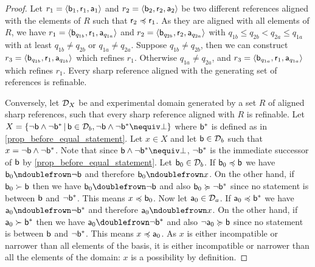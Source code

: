 \documentclass[11pt,letterpaper,fleqn]{memoir} %
\begin{document}
\begin{mathSection}
\begin{proof}
	Let $r_1 = \langle \stmt[b]_1, \stmt[r]_1, \stmt[a]_1\rangle$ and $r_2 = \langle \stmt[b]_2, \stmt[r]_2, \stmt[a]_2\rangle$ be two different references aligned with the elements of $R$ such that $\stmt[r]_2 \narrower \stmt[r]_1$. As they are aligned with all elements of $R$, we have $r_1 = \langle \stmt[b]_{q_{1b}}, \stmt[r]_1, \stmt[a]_{q_{1a}}\rangle$ and $r_2 = \langle \stmt[b]_{q_{2b}}, \stmt[r]_2, \stmt[a]_{q_{2a}}\rangle$ with $q_{1b} \leq q_{2b} < q_{2a} \leq q_{1a}$ with at least $q_{1b} \neq q_{2b}$ or $q_{1a} \neq q_{2a}$. Suppose $q_{1b} \neq q_{2b}$, then we can construct $r_3 = \langle \stmt[b]_{q_{1b}}, \stmt[r]_1, \stmt[a]_{q_{1b}}\rangle$ which refines $r_1$. Otherwise $q_{1a} \neq q_{2a}$, and  $r_3 = \langle \stmt[b]_{q_{1a}}, \stmt[r]_1, \stmt[a]_{q_{1a}}\rangle$ which refines $r_1$. Every sharp reference aligned with the generating set of references  is refinable.
	
	Conversely, let $\edomain_X$ be and experimental domain generated by a set $R$ of aligned sharp references, such that every sharp reference aligned with $R$ is refinable. Let $X = \{\NOT \stmt[b] \AND \NOT \stmt[b]^* \, | \,  \stmt[b] \in \edomain_b, \NOT \stmt[b] \AND \NOT \stmt[b]^* \nequiv \contradiction \}$ where $\stmt[b]^*$ is defined as in \ref{prop_before_equal_statement}. Let $x \in X$ and let $\stmt[b] \in \edomain_b$ such that $x=\NOT \stmt[b] \AND \NOT \stmt[b]^*$. Note that since $\stmt[b] \AND \NOT \stmt[b]^* \nequiv \contradiction$, $\NOT \stmt[b]^*$ is the immediate successor of $\stmt[b]$ by \ref{prop_before_equal_statement}. Let $\stmt[b]_0 \in \edomain_b$. If $\stmt[b]_0 \narrower \stmt[b]$ we have $\stmt[b]_0\ncomp \NOT \stmt[b]$ and therefore $\stmt[b]_0 \ncomp x$. On the other hand, if $\stmt[b]_0 \sbroader \stmt[b]$ then we have $\stmt[b]_0 \comp \NOT \stmt[b]$ and also $\stmt[b]_0 \broader \NOT \stmt[b]^*$ since no statement is between $\stmt[b]$ and $\NOT \stmt[b]^*$. This means $x \narrower \stmt[b]_0$. Now let $\stmt[a]_0 \in \edomain_a$. If $\stmt[a]_0 \narrower \stmt[b]^*$ we have $\stmt[a]_0 \ncomp \NOT \stmt[b]^*$ and therefore $\stmt[a]_0 \ncomp x$. On the other hand, if $\stmt[a]_0 \sbroader \stmt[b]^*$ then we have $\stmt[a]_0 \comp \NOT \stmt[b]^*$ and also $\NOT \stmt[a]_0 \broader \stmt[b]$ since no statement is between $\stmt[b]$ and $\NOT \stmt[b]^*$. This means $x \narrower \stmt[a]_0$. As $x$ is either incompatible or narrower than all elements of the basis, it is either incompatible or narrower than all the elements of the domain: $x$ is a possibility by definition.
	

\end{proof}
\end{mathSection}
\end{document}
